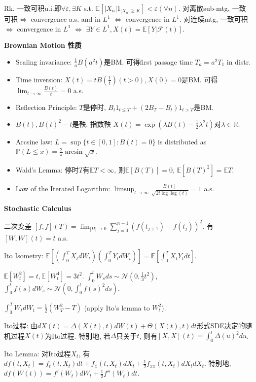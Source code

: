 \documentclass[UTF8]{ctexart}
\begin{document}
Rk. 一致可积u.i.即$\forall \varepsilon, \exists K$ s.t. $\mathbb{E}[|X_n|1_{|X_n|\geq K}]<\varepsilon (\forall n)$.
对离散sub-mtg, 一致可积$\Leftrightarrow$ convergence a.s. and in $L^1$  $\Leftrightarrow$ convergence in $L^1$.
对连续mtg, 一致可积$\Leftrightarrow$ convergence in $L^1$  $\Leftrightarrow$ $\exists Y\in L^1, X(t)=\mathbb{E}[Y|\mathcal{F}(t)]$.


\noindent \textbf{Brownian Motion 性质}
\begin{itemize}
\item Scaling invariance: $\frac{1}{a} B(a^2t)$是BM. 可得first passage time $T_a=a^2 T_1$ in distr.
\item Time inversion: $X(t)=tB(\frac{1}{t})(t>0),X(0)=0$是BM. 可得 $\lim_{t\to\infty}\frac{B(t)}{t}=0$ a.s. 
\item Reflection Principle: $T$是停时, $B_t1_{t\leq T}+(2B_T-B_t)1_{t>T}$是BM.
\item $B(t), B(t)^2-t$是鞅. 指数鞅 $X(t)=\exp(\lambda B(t)-\frac12 \lambda^2 t)$对$\lambda\in\mathbb{R}$.
\item Arcsine law: $L=\sup \{t\in[0,1]:B(t)=0\}$ is distributed as $\mathbb{P}(L\leq x)=\frac{2}{\pi}\arcsin\sqrt{x}$.
\item Wald's Lemma: 停时$T$有$\mathbb{E}T <\infty$, 则$\mathbb{E}[B(T)]=0$, $\mathbb{E}[B(T)^2]=\mathbb{E}T$.
\item Law of the Iterated Logarithm: $\limsup _{t \rightarrow \infty} \frac{B(t)}{\sqrt{2 t \log \log (t)}}=1$ a.s.
\end{itemize}


\noindent \textbf{Stochastic Calculus}

二次变差 $[f,f](T)=\lim_{|\Pi|\to 0} \sum_{j=0}^{n-1}(f(t_{j+1})-f(t_j))^2$. 有 $[W,W](t)=t$ a.s.

Ito Isometry: $\mathbb{E}\left[ (\int_0^T X_t dW_t)(\int_0^T Y_t dW_t) \right]
=\mathbb{E}\left[ \int_0^T X_t Y_t dt \right]$.

$\mathbb{E}[W_t^2]=t, \mathbb{E}[W_t^4]=3t^2$.
$\int_0^t W_s ds \sim \mathcal{N}(0,\frac13 t^2)$,
$\int_0^t f(s) dW_s \sim \mathcal{N}\left(0,\int_0^t f(s)^2 ds\right)$.

$\int_0^T W_tdW_t = \frac12 (W_T^2-T)$ (apply Ito's lemma to $W_t^2$).

Ito过程: 由$dX(t)=\Delta(X(t),t)dW(t)+\Theta(X(t),t)dt$形式SDE决定的随机过程$X(t)$为Ito过程.
特别地, 若$\Delta$只关于$t$, 则有$[X,X](t)=\int_0^t \Delta(u)^2 du$.

Ito Lemma: 对Ito过程$X_t$, 有
$df(t,X_t) = f_t(t,X_t)dt + f_x(t,X_t)dX_t+\frac{1}{2}f_{xx}(t,X_t)dX_tdX_t$.
特别地, $df(W(t)) = f'(W_t)dW_t + \frac{1}{2}f''(W_t)dt$. 
\end{document}
